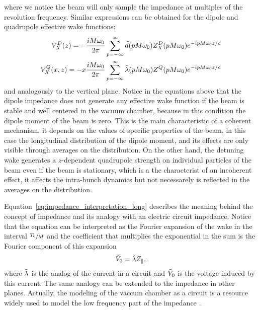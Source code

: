     where we notice the beam will only sample the impedance at multiples of the revolution frequency. Similar expressions can be obtained for the dipole and quadrupole effective wake functions:
    \begin{subequations}\label{eq:impedance_interpretation_trans}
    \begin{align}\label{eq:impedance_interpretation_dip}
  		V^D_X(z) = -\frac{iM\omega_0}{2\pi} \sum_{p=-\infty}^\infty \tilde{d}(pM\omega_0)Z^D_X(pM\omega_0)e^{-ipM\omega_0 z/c}\\
        \label{eq:impedance_interpretation_quad}
		V^Q_X(x,z) = -x\frac{iM\omega_0}{2\pi} \sum_{p=-\infty}^\infty \tilde{\lambda}(pM\omega_0)Z^Q(pM\omega_0)e^{-ipM\omega_0 z/c}
    \end{align}
    \end{subequations}
    and analogously to the vertical plane. Notice in the equations above that the dipole impedance does not generate any effective wake function if the beam is stable and well centered in the vacuum chamber, because in this condition the dipole moment of the beam is zero. This is the main characteristic of a coherent mechanism, it depends on the values of specific properties of the beam, in this case the longitudinal distribution of the dipole moment, and its effects are only visible through averages on the distribution. On the other hand, the detuning wake generates a $z$-dependent quadrupole strength on individual particles of the beam even if the beam is stationary, which is a the characterist of an incoherent effect, it affects the intra-bunch dynamics but not necessarely is reflected in the averages on the distribution.

    Equation~\eqref{eq:impedance_interpretation_long} describes the meaning behind the concept of impedance and its analogy with an electric circuit impedance. Notice that the equation can be interpreted as the Fourier expansion of the wake in the interval $\sfrac{T_0}{M}$ and the coefficient that multiplies the exponential in the sum is the Fourier component of this expansion
    \begin{align}
  	  	\tilde{V}_0 = \tilde{\lambda}Z_\parallel,
    \end{align}
    where $\tilde{\lambda}$ is the analog of the current in a circuit and $\tilde{V}_0$ is the voltage induced by this current. The same analogy can be extended to the impedance in other planes. Actually, the modeling of the vaccum chamber as a circuit is a resource widely used to model the low frequency part of the impedance~\cite{Sessler1967,Zotter1998,Davino2003}.

